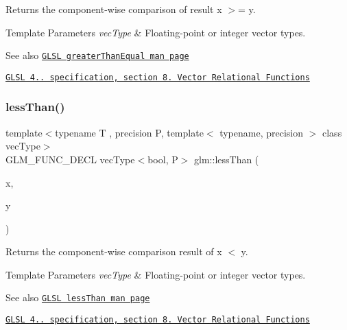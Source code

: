 Returns the component-\/wise comparison of result x $>$= y.


\begin{DoxyTemplParams}{Template Parameters}
{\em vec\+Type} & Floating-\/point or integer vector types.\\
\hline
\end{DoxyTemplParams}
\begin{DoxySeeAlso}{See also}
\href{http://www.opengl.org/sdk/docs/manglsl/xhtml/greaterThanEqual.xml}{\tt G\+L\+SL greater\+Than\+Equal man page} 

\href{http://www.opengl.org/registry/doc/GLSLangSpec.4.20.8.pdf}{\tt G\+L\+SL 4.. specification, section 8. Vector Relational Functions} 
\end{DoxySeeAlso}
\mbox{\label{group__core__func__vector__relational_ga6261970937a70b0b747ae0d3ade1c188}} 
\subsubsection{\texorpdfstring{less\+Than()}{lessThan()}}
{\footnotesize\ttfamily template$<$typename T , precision P, template$<$ typename, precision $>$ class vec\+Type$>$ \\
G\+L\+M\+\_\+\+F\+U\+N\+C\+\_\+\+D\+E\+CL vec\+Type$<$bool, P$>$ glm\+::less\+Than (\begin{DoxyParamCaption}\item[{vec\+Type$<$ T, P $>$ const \&}]{x,  }\item[{vec\+Type$<$ T, P $>$ const \&}]{y }\end{DoxyParamCaption})}

Returns the component-\/wise comparison result of x $<$ y.


\begin{DoxyTemplParams}{Template Parameters}
{\em vec\+Type} & Floating-\/point or integer vector types.\\
\hline
\end{DoxyTemplParams}
\begin{DoxySeeAlso}{See also}
\href{http://www.opengl.org/sdk/docs/manglsl/xhtml/lessThan.xml}{\tt G\+L\+SL less\+Than man page} 

\href{http://www.opengl.org/registry/doc/GLSLangSpec.4.20.8.pdf}{\tt G\+L\+SL 4.. specification, section 8. Vector Relational Functions} 
\end{DoxySeeAlso}
\mbox{\label{group__core__func__vector__relational_gaaf1d88119f11200c32011de7c5ec0102}} 
